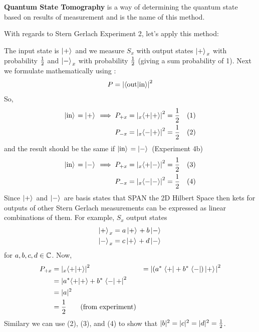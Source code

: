 \documentclass[english, 11pt]{article}
\begin{document}
          \textbf{Quantum State Tomography} is a way of determining the quantum state based on results of measurement and is the name of this method.

          With regards to Stern Gerlach Experiment 2, let's apply this method:
          \newline

          The input state is $\left| + \rangle \right.$ and we measure $S_x$ with output states $\left| + \rangle \right._x$ with probability $\frac{1}{2}$ and $\left| - \rangle \right._x$ with probability $\frac{1}{2}$ (giving a sum probability of 1). Next we formulate mathematically using  :
          \[ P = \left| \langle \mbox{out} | \mbox{in} \rangle \right|^2 \]
          So,
          \begin{align*}
            \left| \mbox{in} \rangle \right.  = \left| + \rangle \right. \implies P_{+x} & = \left| {}_x\langle + | + \rangle \right|^2 = \frac{1}{2} & (1) \\
            P_{-x} & = \left| {}_x\langle - | + \rangle \right|^2 = \frac{1}{2} & (2) \\
          \end{align*}
          and the result should be the same if $\left| \mbox{in} \rangle \right. = \left| - \rangle \right.$ (Experiment 4b)
          \begin{align*}
            \left| \mbox{in} \rangle \right.  = \left| - \rangle \right. \implies P_{+x} & = \left| {}_x\langle + | - \rangle \right|^2 = \frac{1}{2} & (3) \\
            P_{-x} & = \left| {}_x\langle - | - \rangle \right|^2 = \frac{1}{2} & (4) \\
          \end{align*}
          Since $\left| + \rangle \right.$ and $\left| - \rangle \right.$ are basis states that SPAN the 2D Hilbert Space then kets for outputs of other Stern Gerlach measurements can be expressed as linear combinations of them. For example, $S_x$ output states
          \begin{align*}
            \left| + \rangle \right._x & = a \left| + \rangle \right. + b\left| - \rangle \right. \\
            \left| - \rangle \right._x & = c \left| + \rangle \right. + d\left| - \rangle \right.
          \end{align*}
          for $a,b,c,d \in {\mathbb{C}}$. Now,
          \begin{align*}
            P_{+x} & = \left| {}_x\langle + | + \rangle \right|^2 & = \left| \left( a^*\left. \langle + \right| + b^*\left. \langle - \right| \right)\left| + \rangle \right. \right|^2 \\
            & = \left|  a^*\langle + | + \rangle + b^*\left. \langle - \right|{+} \right|^2 \\
            & = |a|^2 \\
            & = \frac{1}{2} \mbox{ \ \ \ \ \ (from experiment)}
          \end{align*}
          Similary we can use (2), (3), and (4) to show that $|b|^2 = |c|^2 = |d|^2 = \frac{1}{2}$.
          \newline
\end{document}

